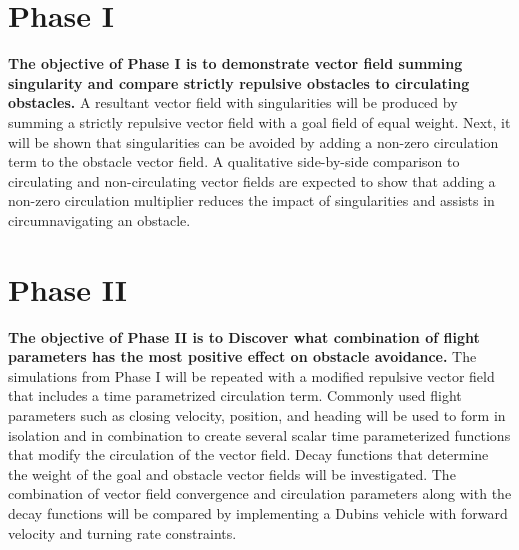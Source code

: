 \documentclass[numbered,pdftex]{ohio-etd}
\begin{document}



\section{Phase I}
\textbf{The objective of Phase I is to demonstrate vector field summing singularity and compare strictly repulsive obstacles to circulating obstacles.} A resultant vector field with singularities will be produced by summing a strictly repulsive vector field with a goal field of equal weight. Next, it will be shown that singularities can be avoided by adding a non-zero circulation term to the obstacle vector field. A qualitative side-by-side comparison to circulating and non-circulating vector fields are expected to show that adding a non-zero circulation multiplier reduces the impact of singularities and assists in circumnavigating an obstacle. 




\section{Phase II}
\textbf{The objective of Phase II is to Discover what combination of flight parameters has the most positive effect on obstacle avoidance.} The simulations from Phase I will be repeated with a modified repulsive vector field that includes a time parametrized circulation term. Commonly used flight parameters such as closing velocity, position, and heading will be used to form in isolation and in combination to create several scalar time parameterized functions that modify the circulation of the vector field. Decay functions that determine the weight of the goal and obstacle vector fields will be investigated. The combination of vector field convergence and circulation parameters along with the decay functions will be compared by implementing a Dubins vehicle with forward velocity and turning rate constraints.
\end{document}
